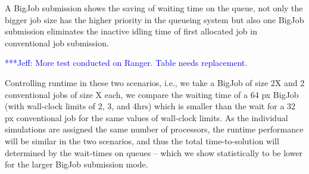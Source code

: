 \documentclass[conference,final]{IEEEtran}
\newcommand{\skonote}[1]{ {\textcolor{blue} { ***Jeff: #1 }}}
\newcommand{\skonote}[1]{}
\begin{document}
A BigJob submission shows the saving of waiting time on the queue, not only the bigger job size has the higher priority in the queueing system but also one BigJob submission eliminates the inactive idling time of first allocated job in conventional job submission.
\newline

\skonote{More test conducted on Ranger. Table needs replacement.}

Controlling runtime in these two scenarios, i.e., we take a BigJob of size 2X and 2 conventional jobs of size X each, we compare the waiting time of a 64 px BigJob (with wall-clock limits of 2, 3, and 4hrs) which is smaller than the wait for a 32 px conventional job for the same values of wall-clock limits. As the individual simulations are assigned the same number of processors, the runtime performance will be similar in the two scenarios, and thus the total time-to-solution will determined by the wait-times on queues -- which we show statistically to be lower for the larger BigJob submission mode.
\end{document}
